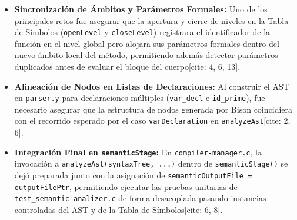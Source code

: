 \documentclass[12pt, a4paper]{article}
\begin{document}
\begin{itemize}
    \item \textbf{Sincronización de Ámbitos y Parámetros Formales:} Uno de los principales retos fue asegurar que la apertura y cierre de niveles en la Tabla de Símbolos (\texttt{openLevel} y \texttt{closeLevel}) registrara el identificador de la función en el nivel global pero alojara sus parámetros formales dentro del nuevo ámbito local del método, permitiendo además detectar parámetros duplicados antes de evaluar el bloque del cuerpo[cite: 4, 6, 13].
    \item \textbf{Alineación de Nodos en Listas de Declaraciones:} Al construir el AST en \texttt{parser.y} para declaraciones múltiples (\texttt{var\_decl} e \texttt{id\_prime}), fue necesario asegurar que la estructura de nodos generada por Bison coincidiera con el recorrido esperado por el caso \texttt{varDeclaration} en \texttt{analyzeAst}[cite: 2, 6].
    \item \textbf{Integración Final en \texttt{semanticStage}:} En \texttt{compiler-manager.c}, la invocación a \texttt{analyzeAst(syntaxTree, ...)} dentro de \texttt{semanticStage()} se dejó preparada junto con la asignación de \texttt{semanticOutputFile = outputFilePtr}, permitiendo ejecutar las pruebas unitarias de \texttt{test\_semantic-analizer.c} de forma desacoplada pasando instancias controladas del AST y de la Tabla de Símbolos[cite: 6, 8].
\end{itemize}
\end{document}
